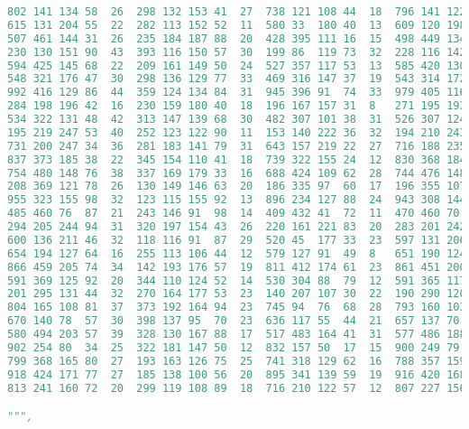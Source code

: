 \begin{lstlisting}[language=python]
802	141	134	58	26	298	132	153	41	27	738	121	108	44	18	796	141	122	54	20
615	131	204	55	22	282	113	152	52	11	580	33	180	40	13	609	120	198	40	18
507	461	144	31	26	235	184	187	88	20	428	395	111	16	15	498	449	134	30	22
230	130	151	90	43	393	116	150	57	30	199	86	119	73	32	228	116	142	79	32
594	425	145	68	22	209	161	149	50	24	527	357	117	53	13	585	420	130	65	21
548	321	176	47	30	298	136	129	77	33	469	316	147	37	19	543	314	172	39	27
992	416	129	86	44	359	124	134	84	31	945	396	91	74	33	979	405	116	86	39
284	198	196	42	16	230	159	180	40	18	196	167	157	31	8	271	195	193	29	14
534	322	131	48	42	313	147	139	68	30	482	307	101	38	31	526	307	124	45	30
195	219	247	53	40	252	123	122	90	11	153	140	222	36	32	194	210	243	44	36
731	200	247	34	36	281	183	141	79	31	643	157	219	22	27	716	188	235	23	34
837	373	185	38	22	345	154	110	41	18	739	322	155	24	12	830	368	184	32	10
754	480	148	76	38	337	169	179	33	16	688	424	109	62	28	744	476	148	65	27
208	369	121	78	26	130	149	146	63	20	186	335	97	60	17	196	355	107	77	15
955	323	155	98	32	123	115	155	92	13	896	234	127	88	24	943	308	144	92	23
485	460	76	87	21	243	146	91	98	14	409	432	41	72	11	470	460	70	81	14
294	205	244	94	31	320	197	154	43	26	220	161	221	83	20	283	201	242	83	17
600	136	211	46	32	118	116	91	87	29	520	45	177	33	23	597	131	206	35	28
654	194	127	64	16	255	113	106	44	12	579	127	91	49	8	651	190	124	51	7
866	459	205	74	34	142	193	176	57	19	811	412	174	61	23	861	451	200	67	19
591	369	125	92	20	344	110	124	52	14	530	304	88	79	12	591	365	117	81	9
201	295	131	44	32	270	164	177	53	23	140	207	107	30	22	190	290	120	29	22
804	165	108	81	37	373	192	164	94	23	745	94	76	68	28	793	160	103	74	36
670	140	78	57	30	398	137	95	70	23	636	117	55	44	21	657	137	70	57	22
580	494	203	57	39	328	130	167	88	17	517	483	164	41	31	577	486	188	48	30
902	254	80	34	25	322	181	147	50	12	832	157	50	17	15	900	249	79	28	18
799	368	165	80	27	193	163	126	75	25	741	318	129	62	16	788	357	159	65	24
918	424	171	77	27	185	138	100	56	20	895	341	139	59	19	916	420	168	74	24
813	241	160	72	20	299	119	108	89	18	716	210	122	57	12	807	227	156	71	9

""",


\end{lstlisting}
